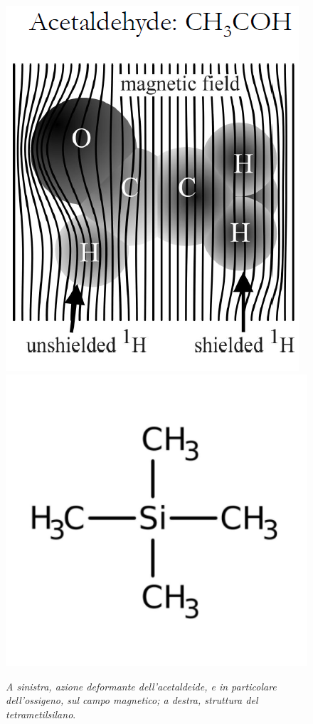 \documentclass{report}
\numberwithin{equation}{section}
\numberwithin{figure}{section}
\begin{document}
\begin{figure}[htp]
\centering
\includegraphics[scale=0.6]{immagini/acetaldeide.png}\quad\includegraphics[scale=0.687]{immagini/tms.png}
\caption{\label{fig:tms} \textit{A sinistra, azione deformante dell'acetaldeide, e in particolare dell'ossigeno, sul campo magnetico; a destra, struttura del tetrametilsilano}.}
\end{figure}
\end{document}
